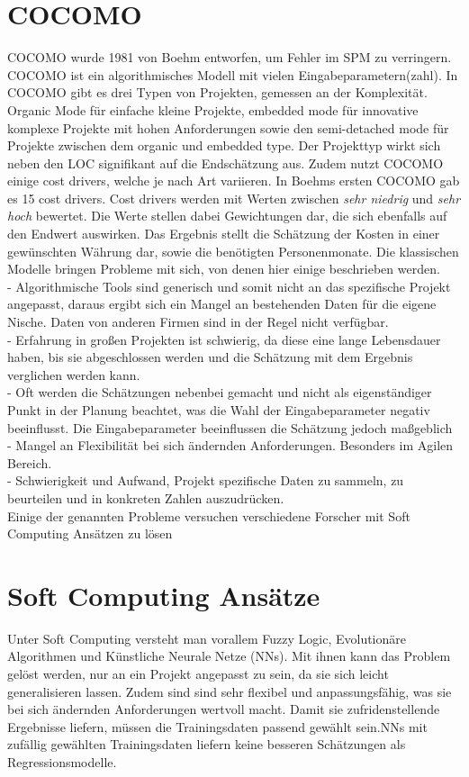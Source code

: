 \section{COCOMO}
 COCOMO wurde 1981 von Boehm entworfen, um Fehler im SPM zu verringern. COCOMO ist ein algorithmisches Modell mit vielen Eingabeparametern(zahl). In COCOMO gibt es drei Typen von Projekten, gemessen an der Komplexität. Organic Mode für einfache kleine Projekte, embedded mode für innovative komplexe Projekte mit hohen Anforderungen sowie den semi-detached mode für Projekte zwischen dem organic und embedded type. Der Projekttyp wirkt sich neben den LOC signifikant auf die Endschätzung aus. Zudem nutzt COCOMO einige cost drivers, welche je nach Art variieren. In Boehms ersten COCOMO gab es 15 cost drivers. Cost drivers werden mit Werten zwischen \textit{sehr niedrig} und \textit{sehr hoch} bewertet. Die Werte stellen dabei Gewichtungen dar, die sich ebenfalls auf den Endwert auswirken. Das Ergebnis stellt die Schätzung der Kosten in einer gewünschten Währung dar, sowie die benötigten Personenmonate. Die klassischen Modelle bringen Probleme mit sich, von denen hier einige beschrieben werden.
 \\
- Algorithmische Tools sind generisch und somit nicht an das spezifische Projekt angepasst, daraus ergibt sich ein Mangel an bestehenden Daten für die eigene Nische. Daten von anderen Firmen sind in der Regel nicht verfügbar. \\
- Erfahrung in großen Projekten ist schwierig, da diese eine lange Lebensdauer haben, bis sie abgeschlossen werden und die Schätzung mit dem Ergebnis verglichen werden kann.\\
- Oft werden die Schätzungen nebenbei gemacht und nicht als eigenständiger Punkt in der Planung beachtet, was die Wahl der Eingabeparameter negativ beeinflusst. Die Eingabeparameter beeinflussen die Schätzung jedoch maßgeblich\\
- Mangel an Flexibilität bei sich ändernden Anforderungen. Besonders im Agilen Bereich.\\
- Schwierigkeit und Aufwand, Projekt spezifische Daten zu sammeln, zu beurteilen und in konkreten Zahlen auszudrücken.
\cite{Chen2005}\cite{Heemstra1992}\cite{Abrahamsson2007}\\
Einige der genannten Probleme versuchen verschiedene Forscher mit Soft Computing Ansätzen zu lösen\cite{Bilgaiyan2016}

\section{Soft Computing Ansätze}
Unter Soft Computing versteht man vorallem Fuzzy Logic, Evolutionäre Algorithmen und Künstliche Neurale Netze (NNs). Mit ihnen kann das Problem gelöst werden, nur an ein Projekt angepasst zu sein, da sie sich leicht generalisieren lassen. Zudem sind sind sehr flexibel und anpassungsfähig, was sie bei sich ändernden Anforderungen wertvoll macht.\cite{Boetticher2001} Damit sie zufridenstellende Ergebnisse liefern, müssen die Trainingsdaten passend gewählt sein.NNs mit zufällig gewählten Trainingsdaten liefern keine besseren Schätzungen als Regressionsmodelle. \cite{Setyawati2002}


